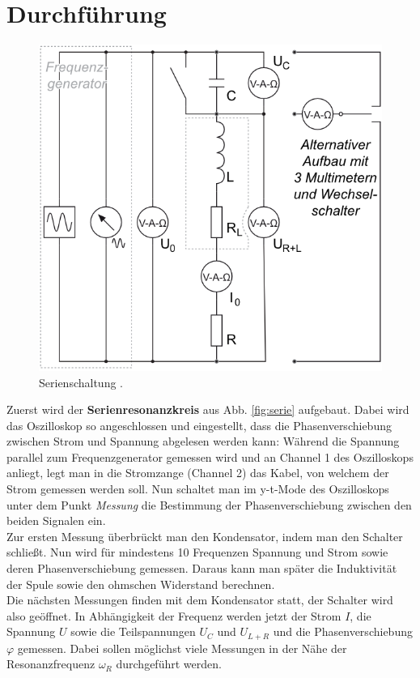\documentclass[12pt,a4paper,titlepage,headinclude,bibtotoc]{scrartcl}
\begin{document}
\section{Durchführung}
\label{sec:durchfuehrung}
\begin{figure}[!htb]
	\centering
	\includegraphics[scale=0.8]{serie.png}
	\caption{Serienschaltung \cite[Datum: 03.10.14]{LP14}.}
	\label{fig:serie}
\end{figure}

Zuerst wird der \textbf{Serienresonanzkreis} aus Abb. \eqref{fig:serie} aufgebaut.
Dabei wird das Oszilloskop so angeschlossen und eingestellt, dass die Phasenverschiebung zwischen Strom und Spannung abgelesen werden kann:
Während die Spannung parallel zum Frequenzgenerator gemessen wird und an Channel 1 des Oszilloskops anliegt, legt man in die Stromzange (Channel 2) das Kabel, von welchem der Strom gemessen werden soll.
Nun schaltet man im y-t-Mode des Oszilloskops unter dem Punkt \emph{Messung} die Bestimmung der Phasenverschiebung zwischen den beiden Signalen ein.\\
Zur ersten Messung überbrückt man den Kondensator, indem man den Schalter schließt.
Nun wird für mindestens 10 Frequenzen Spannung und Strom sowie deren Phasenverschiebung gemessen.
Daraus kann man später die Induktivität der Spule sowie den ohmschen Widerstand berechnen.\\
Die nächsten Messungen finden mit dem Kondensator statt, der Schalter wird also geöffnet.
In Abhängigkeit der Frequenz werden jetzt der Strom $I$, die Spannung $U$ sowie die Teilspannungen $U_C$ und $U_{L+R}$ und die Phasenverschiebung $\varphi$ gemessen.
Dabei sollen möglichst viele Messungen in der Nähe der Resonanzfrequenz $\omega_R$ durchgeführt werden.\\
\end{document}
